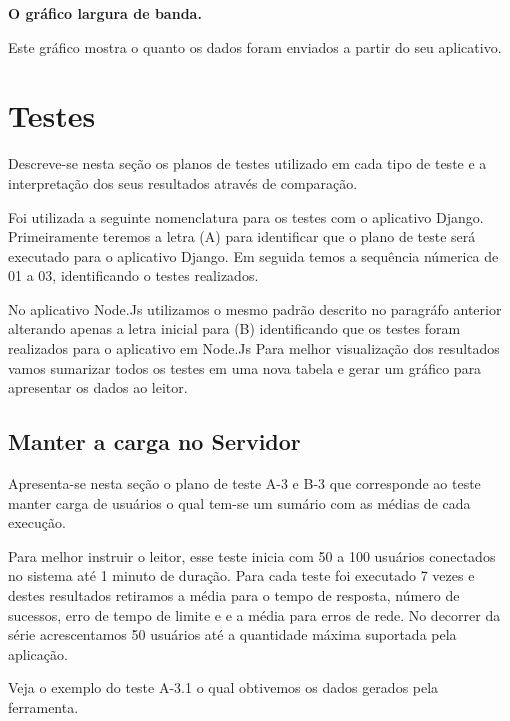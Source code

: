   \textbf{O gráfico largura de banda.}
  
  Este gráfico mostra o quanto os dados foram enviados a partir do seu aplicativo.


\section{Testes}

  Descreve-se nesta seção os planos de testes utilizado em cada tipo de teste e a interpretação dos seus resultados
  através de comparação.
  
  Foi utilizada a seguinte nomenclatura para os testes com o aplicativo Django. Primeiramente teremos a letra (A) para identificar
  que o plano de teste será executado para o aplicativo Django. Em seguida temos a sequência númerica de 01 a 03, 
  identificando o testes realizados. 
  
  No aplicativo Node.Js utilizamos o mesmo padrão descrito no paragráfo anterior alterando apenas a letra inicial para (B) identificando
  que os testes foram realizados para o aplicativo em Node.Js
  Para melhor visualização dos resultados vamos sumarizar todos os testes em uma nova tabela e gerar um gráfico para apresentar
  os dados ao leitor.
    
\subsection{Manter a carga no Servidor}  

    
  Apresenta-se nesta seção o plano de teste A-3 e B-3 que corresponde ao teste manter carga de usuários o qual tem-se um sumário
  com as médias de cada execução.
  
  Para melhor instruir o leitor, esse teste inicia com 50 a 100 usuários conectados no sistema até 1 minuto de duração. Para cada teste
  foi executado 7 vezes e destes resultados retiramos a média para o tempo de resposta, número de sucessos, erro de tempo de limite e
  e a média para erros de rede. No decorrer da série acrescentamos 50 usuários até a quantidade máxima suportada pela aplicação.
  
  Veja o exemplo do teste A-3.1 o qual obtivemos os dados gerados pela ferramenta.
  
